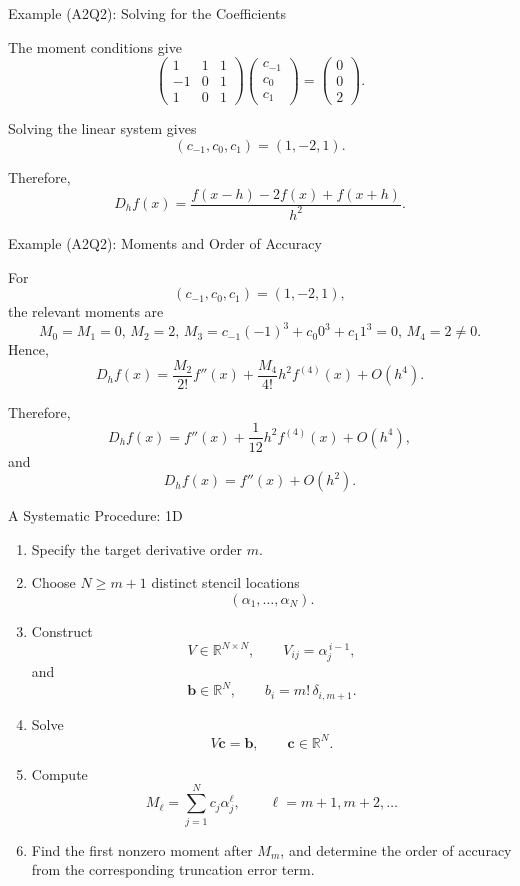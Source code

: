 \documentclass{beamer}
\begin{document}
\begin{frame}{Example (A2Q2): Solving for the Coefficients}

The moment conditions give
\[
\begin{pmatrix}
1&1&1\\
-1&0&1\\
1&0&1
\end{pmatrix}
\begin{pmatrix}
c_{-1}\\c_0\\c_1
\end{pmatrix}
=
\begin{pmatrix}
0\\0\\2
\end{pmatrix}.
\]

Solving the linear system gives
\[
(c_{-1},c_0,c_1)=(1,-2,1).
\]

Therefore,
\[
D_hf(x)
=
\frac{
f(x-h)-2f(x)+f(x+h)
}{h^2}.
\]

\end{frame}

\begin{frame}{Example (A2Q2): Moments and Order of Accuracy}

For
\[
(c_{-1},c_0,c_1)=(1,-2,1),
\]
the relevant moments are
\[
M_0 =M_1=0, \,M_2=2,\, M_3=c_{-1}(-1)^3 + c_0 0^3 + c_1 1^3 = 0, \,M_4=2\neq0.
\]
Hence,
\[
D_hf(x)
=
\frac{M_2}{2!}f''(x)
+
\frac{M_4}{4!}h^2f^{(4)}(x)
+
O(h^4).
\]

Therefore,
\[
D_hf(x)
=
f''(x)
+\frac{1}{12}h^2f^{(4)}(x)
+O(h^4),
\]
and
\[
\boxed{
D_hf(x)=f''(x)+O(h^2).
}
\]
\end{frame}

\begin{frame}{A Systematic Procedure: 1D}

\small
\setlength{\itemsep}{2pt}

\begin{enumerate}
    \item Specify the target derivative order \(m\).

    \item Choose \(N\geq m+1\) distinct stencil locations
    \[
    (\alpha_1,\ldots,\alpha_N).
    \]

    \item Construct
    \[
    V\in\mathbb{R}^{N\times N},
    \qquad
    V_{ij}=\alpha_j^{\,i-1},
    \]
    and
    \[
    \boldsymbol b\in\mathbb{R}^N,
    \qquad
    b_i=m!\,\delta_{i,m+1}.
    \]

    \item Solve
    \[
    V\boldsymbol c=\boldsymbol b,
    \qquad
    \boldsymbol c\in\mathbb{R}^N.
    \]

    \item Compute
    \[
    M_\ell=\sum_{j=1}^N c_j\alpha_j^\ell,
    \qquad
    \ell=m+1,m+2,\ldots
    \]

    \item Find the first nonzero moment after \(M_m\), and determine
    the order of accuracy from the corresponding truncation error term.
\end{enumerate}
\end{frame}
\end{document}
